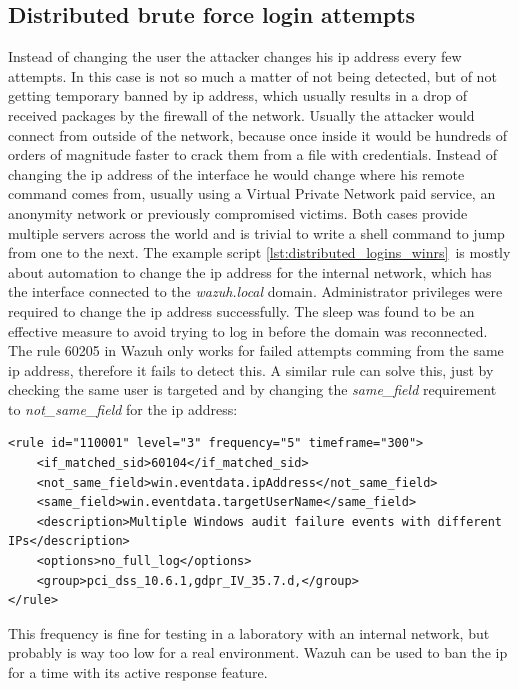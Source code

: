 \subsection{Distributed brute force login attempts}
Instead of changing the user the attacker changes his ip address every few attempts. In this case is not so much a matter of not being detected, but of not getting temporary banned by ip address, which usually results in a drop of received packages by the firewall of the network.
\linej
\linej
Usually the attacker would connect from outside of the network, because once inside it would be hundreds of orders of magnitude faster to crack them from a file with credentials.
Instead of changing the ip address of the interface he would change where his remote command comes from, usually using a Virtual Private Network paid service, an anonymity network or previously compromised victims.
Both cases provide multiple servers across the world and is trivial to write a shell command to jump from one to the next.
\linej
The example script \ref{lst:distributed_logins_winrs}\ is mostly about automation to change the ip address for the internal network, which has the interface connected to the \textit{wazuh.local} domain.
Administrator privileges were required to change the ip address successfully. The sleep was found to be an effective measure to avoid trying to log in before the domain was reconnected.
\linej
\linej
The rule 60205 in Wazuh only works for failed attempts comming from the same ip address, therefore it fails to detect this. A similar rule can solve this, just by checking the same user is targeted and by changing the \textit{same\_field} requirement to \textit{not\_same\_field} for the ip address:
\begin{lstlisting}[style=xml]
<rule id="110001" level="3" frequency="5" timeframe="300">
	<if_matched_sid>60104</if_matched_sid>
	<not_same_field>win.eventdata.ipAddress</not_same_field>
	<same_field>win.eventdata.targetUserName</same_field>
	<description>Multiple Windows audit failure events with different IPs</description>
	<options>no_full_log</options>
	<group>pci_dss_10.6.1,gdpr_IV_35.7.d,</group>
</rule>
\end{lstlisting}
\linej
This frequency is fine for testing in a laboratory with an internal network, but probably is way too low for a real environment.
Wazuh can be used to ban the ip for a time with its active response feature\cite{active_response}.

